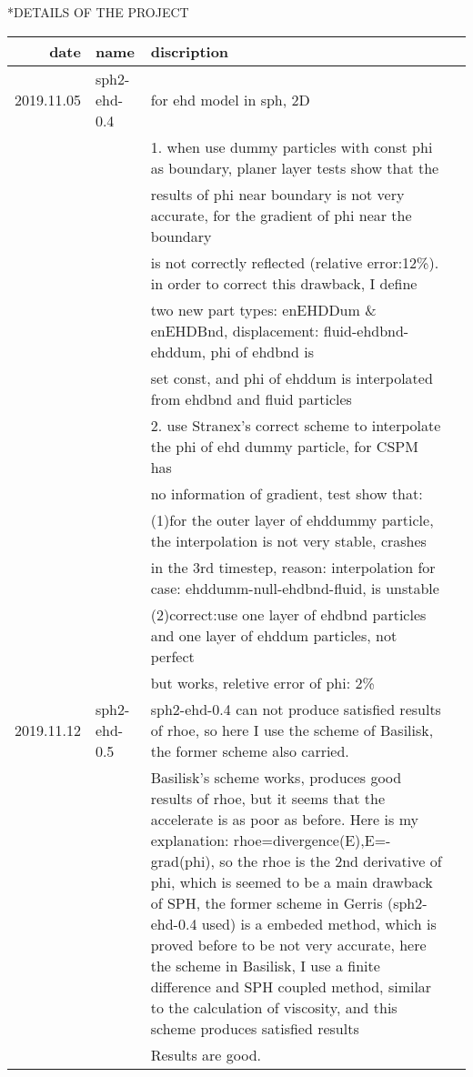 \documentclass[11pt]{article}
\author{stardiviner}
\date{\today}
\title{}
\begin{document}
\tableofcontents

*DETAILS OF THE PROJECT
\begin{center}
\begin{tabular}{rlll}
date & name & discription & \\
\hline
\hline
2019.11.05 & sph2-ehd-0.4 & for ehd model in sph, 2D & \\
 &  & 1. when use dummy particles with const phi as boundary, planer layer tests show that the & \\
 &  & results of phi near boundary is not very accurate, for the gradient of phi near the boundary & \\
 &  & is not correctly reflected (relative error:12\%). in order to correct this drawback, I define & \\
 &  & two new part types: enEHDDum \& enEHDBnd, displacement: fluid-ehdbnd-ehddum, phi of ehdbnd is & \\
 &  & set const, and phi of ehddum is interpolated from ehdbnd and fluid particles & \\
 &  & 2. use Stranex's correct scheme to interpolate the phi of ehd dummy particle, for CSPM has & \\
 &  & no information of gradient, test show that: & \\
 &  & (1)for the outer layer of ehddummy particle, the interpolation is not very stable, crashes & \\
 &  & in the 3rd timestep, reason: interpolation for case: ehddumm-null-ehdbnd-fluid, is unstable & \\
 &  & (2)correct:use one layer of ehdbnd particles and one layer of ehddum particles, not perfect & \\
 &  & but works, reletive error of phi: 2\% & \\
\hline
2019.11.12 & sph2-ehd-0.5 & sph2-ehd-0.4 can not produce satisfied results of rhoe, so here I use the scheme of Basilisk, the former scheme also carried. & \\
 &  & Basilisk's scheme works, produces good results of rhoe, but it seems that the accelerate is as poor as before. Here is my explanation: rhoe=divergence(E),E=-grad(phi), so the rhoe is the 2nd derivative of phi, which is seemed to be a main drawback of SPH, the former scheme in Gerris (sph2-ehd-0.4 used) is a embeded method, which is proved before to be not very accurate, here the scheme in Basilisk, I use a finite difference and SPH coupled method, similar to the calculation of viscosity, and this scheme produces satisfied results & \\
 &  & Results are good. & \\
\end{tabular}
\end{center}
\end{document}
